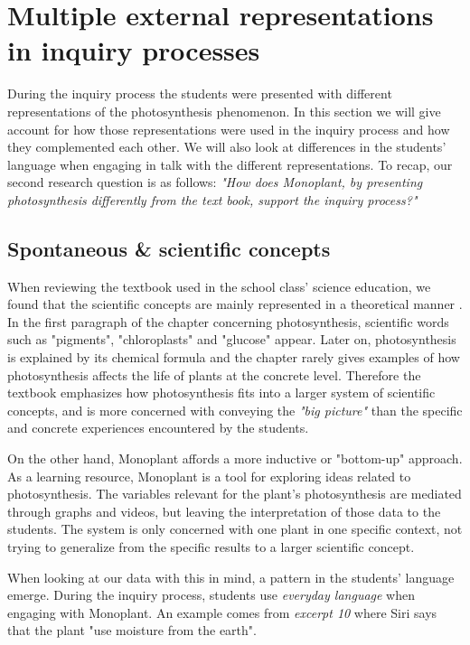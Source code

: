 \section{Multiple external representations in inquiry processes}
During the inquiry process the students were presented with different representations of the photosynthesis phenomenon. In this section we will give account for how those representations were used in the inquiry process and how they complemented each other. We will also look at differences in the students' language when engaging in talk with the different representations. To recap, our second research question is as follows: \emph{"How does Monoplant, by presenting photosynthesis differently from the text book, support the inquiry process?"}

\subsection{Spontaneous \& scientific concepts}
When reviewing the textbook used in the school class' science education, we found that the scientific concepts are mainly represented in a theoretical manner \citep{bios}. In the first paragraph of the chapter concerning photosynthesis, scientific words such as "pigments", "chloroplasts" and "glucose" appear. Later on, photosynthesis is explained by its chemical formula and the chapter rarely gives examples of how photosynthesis affects the life of plants at the concrete level. Therefore the textbook emphasizes how photosynthesis fits into a larger system of scientific concepts, and is more concerned with conveying the \emph{"big picture"} than the specific and concrete experiences encountered by the students. 

On the other hand, Monoplant affords a more inductive or "bottom-up" approach. As a learning resource, Monoplant is a tool for exploring ideas related to photosynthesis. The variables relevant for the plant's photosynthesis are mediated through graphs and videos, but leaving the interpretation of those data to the students. The system is only concerned with one plant in one specific context, not trying to generalize from the specific results to a larger scientific concept. 

When looking at our data with this in mind, a pattern in the students' language emerge. During the inquiry process, students use \emph{everyday language} when engaging with Monoplant. An example comes from \emph{excerpt 10} where Siri says that the plant "use moisture from the earth". 

